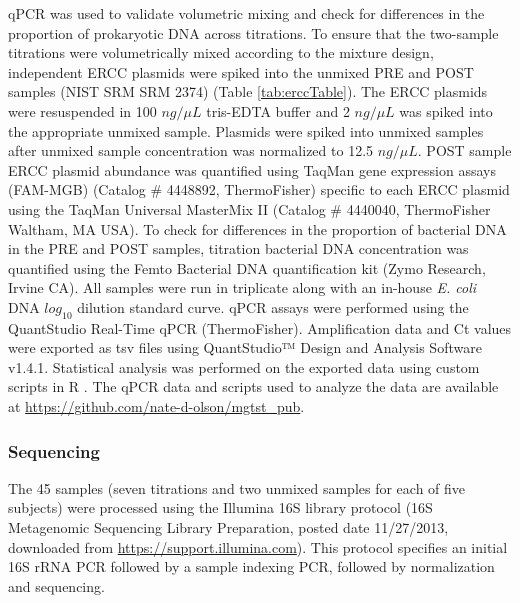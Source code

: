 \documentclass{bmcart}
\begin{document}
qPCR was used to validate volumetric mixing and check for differences in
the proportion of prokaryotic DNA across titrations. To ensure that the
two-sample titrations were volumetrically mixed according to the mixture
design, independent ERCC plasmids were spiked into the unmixed PRE and
POST samples \cite{baker2005external} (NIST SRM SRM 2374) (Table
\ref{tab:erccTable}). The ERCC plasmids were resuspended in 100
\(ng/\mu L\) tris-EDTA buffer and 2 \(ng/\mu L\) was spiked into the
appropriate unmixed sample. Plasmids were spiked into unmixed samples
after unmixed sample concentration was normalized to 12.5 \(ng/\mu L\).
POST sample ERCC plasmid abundance was quantified using TaqMan gene
expression assays (FAM-MGB) (Catalog \# 4448892, ThermoFisher) specific
to each ERCC plasmid using the TaqMan Universal MasterMix II (Catalog \#
4440040, ThermoFisher Waltham, MA USA). To check for differences in the
proportion of bacterial DNA in the PRE and POST samples, titration
bacterial DNA concentration was quantified using the Femto Bacterial DNA
quantification kit (Zymo Research, Irvine CA). All samples were run in
triplicate along with an in-house \emph{E. coli} DNA \(log_{10}\)
dilution standard curve. qPCR assays were performed using the
QuantStudio Real-Time qPCR (ThermoFisher). Amplification data and Ct
values were exported as tsv files using QuantStudio™ Design and Analysis
Software v1.4.1. Statistical analysis was performed on the exported data
using custom scripts in R \cite{R}. The qPCR data and scripts used
to analyze the data are available at
\url{https://github.com/nate-d-olson/mgtst_pub}.

\subsubsection*{Sequencing}

The 45 samples (seven titrations and two unmixed samples for each of
five subjects) were processed using the Illumina 16S library protocol
(16S Metagenomic Sequencing Library Preparation, posted date 11/27/2013,
downloaded from \url{https://support.illumina.com}). This protocol
specifies an initial 16S rRNA PCR followed by a sample indexing PCR,
followed by normalization and sequencing.
\end{document}
